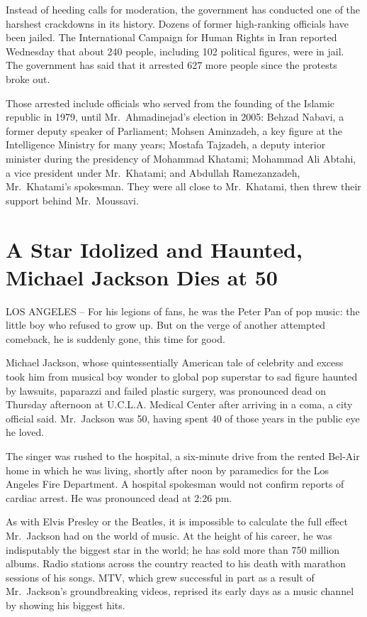 ﻿\documentclass[12pt]{article}
\begin{document}
Instead of heeding calls for moderation, the government has conducted one of the harshest crackdowns
in its history. Dozens of former high-ranking officials have been jailed. The International Campaign
for Human Rights in Iran reported Wednesday that about 240 people, including 102 political figures,
were in jail. The government has said that it arrested 627 more people since the protests broke out.

Those arrested include officials who served from the founding of the Islamic republic in 1979, until
Mr.~Ahmadinejad's election in 2005: Behzad Nabavi, a former deputy speaker of Parliament; Mohsen
Aminzadeh, a key figure at the Intelligence Ministry for many years; Mostafa Tajzadeh, a deputy
interior minister during the presidency of Mohammad Khatami; Mohammad Ali Abtahi, a vice president
under Mr.~Khatami; and Abdullah Ramezanzadeh, Mr.~Khatami's spokesman. They were all close to
Mr.~Khatami, then threw their support behind Mr.~Moussavi.

\section{A Star Idolized and Haunted, Michael Jackson Dies at 50}

LOS ANGELES -- For his legions of fans, he was the Peter Pan of pop music: the little boy who
refused to grow up. But on the verge of another attempted comeback, he is suddenly gone, this time
for good.

Michael Jackson, whose quintessentially American tale of celebrity and excess took him from musical
boy wonder to global pop superstar to sad figure haunted by lawsuits, paparazzi and failed plastic
surgery, was pronounced dead on Thursday afternoon at U.C.L.A. Medical Center after arriving in a
coma, a city official said. Mr.~Jackson was 50, having spent 40 of those years in the public eye he
loved.

The singer was rushed to the hospital, a six-minute drive from the rented Bel-Air home in which he
was living, shortly after noon by paramedics for the Los Angeles Fire Department. A hospital
spokesman would not confirm reports of cardiac arrest. He was pronounced dead at 2:26 pm.

As with Elvis Presley or the Beatles, it is impossible to calculate the full effect Mr.~Jackson had
on the world of music. At the height of his career, he was indisputably the biggest star in the
world; he has sold more than 750 million albums. Radio stations across the country reacted to his
death with marathon sessions of his songs. MTV, which grew successful in part as a result of
Mr.~Jackson's groundbreaking videos, reprised its early days as a music channel by showing his
biggest hits.
\end{document}
